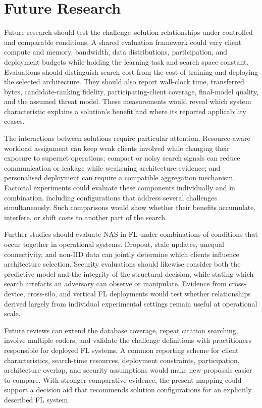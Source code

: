 \section{Future Research}

Future research should test the challenge--solution relationships under controlled and comparable conditions. A shared evaluation framework could vary client compute and memory, bandwidth, data distributions, participation, and deployment budgets while holding the learning task and search space constant. Evaluations should distinguish search cost from the cost of training and deploying the selected architecture. They should also report wall-clock time, transferred bytes, candidate-ranking fidelity, participating-client coverage, final-model quality, and the assumed threat model. These measurements would reveal which system characteristic explains a solution's benefit and where its reported applicability ceases.

The interactions between solutions require particular attention. Resource-aware workload assignment can keep weak clients involved while changing their exposure to supernet operations; compact or noisy search signals can reduce communication or leakage while weakening architecture evidence; and personalised deployment can require a compatible aggregation mechanism. Factorial experiments could evaluate these components individually and in combination, including configurations that address several challenges simultaneously. Such comparisons would show whether their benefits accumulate, interfere, or shift costs to another part of the search.

Further studies should evaluate NAS in FL under combinations of conditions that occur together in operational systems. Dropout, stale updates, unequal connectivity, and non-IID data can jointly determine which clients influence architecture selection. Security evaluations should likewise consider both the predictive model and the integrity of the structural decision, while stating which search artefacts an adversary can observe or manipulate. Evidence from cross-device, cross-silo, and vertical FL deployments would test whether relationships derived largely from individual experimental settings remain useful at operational scale.

Future reviews can extend the database coverage, repeat citation searching, involve multiple coders, and validate the challenge definitions with practitioners responsible for deployed FL systems. A common reporting scheme for client characteristics, search-time resources, deployment constraints, participation, architecture overlap, and security assumptions would make new proposals easier to compare. With stronger comparative evidence, the present mapping could support a decision aid that recommends solution configurations for an explicitly described FL system.
